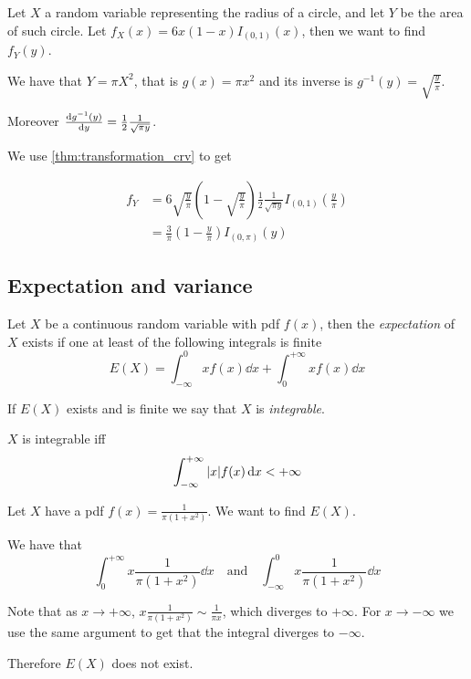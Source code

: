 \documentclass[14pt]{extarticle}
\begin{document}
\begin{example}
    Let $X$ a random variable representing the radius of a circle, and let $Y$ be the area of such circle.
    Let $f_X(x) = 6x(1-x)I_{(0,1)}(x)$, then we want to find $f_Y(y)$.

    We have that $Y = \pi X^2$, that is $g(x) = \pi x^2$ and its inverse is $g^{-1}(y) = \sqrt{\frac{y}{\pi}}$.

    Moreover $\dv{g^{-1}(y)}{y} = \frac{1}{2} \frac{1}{\sqrt{\pi y}}$.

    We use \autoref{thm:transformation_crv} to get

    \begin{align}
        f_Y & = 6\sqrt{\frac{y}{\pi}} \left(1- \sqrt{\frac{y}{\pi}}\right) \frac{1}{2} \frac{1}{\sqrt{\pi y}} I_{(0, 1)}\left(\frac{y}{\pi}\right) \\
            & = \frac{3}{\pi} \left(1- \frac{y}{\pi}\right) I_{(0, \pi)}(y)
    \end{align}

\end{example}

\subsection{Expectation and variance}

\begin{definition}[expectation]
    Let $X$ be a continuous random variable with pdf $f(x)$, then the \emph{expectation} of $X$ exists if one at least of the following integrals is finite
    \begin{equation}
        E(X) = \int_{-\infty}^{0} x f(x) \dd{x} + \int_{0}^{+\infty} x f(x) \dd{x}
    \end{equation}

    If $E(X)$ exists and is finite we say that $X$ is \emph{integrable}.
\end{definition}

\begin{lemma}
    $X$ is integrable iff
    \begin{equation}
        \int_{-\infty}^{+\infty} \abs{x} f(x) \dd{x} < +\infty
    \end{equation}
\end{lemma}

\begin{example}
    Let $X$ have a pdf $f(x) = \frac{1}{\pi (1+x^2)}$.
    We want to find $E(X)$.

    We have that
    \begin{equation}
        \int_0^{+\infty} x \frac{1}{\pi (1+x^2)} \dd{x} \quad \text{and} \quad \int_{-\infty}^0 x \frac{1}{\pi (1+x^2)} \dd{x}
    \end{equation}

    Note that as $x \to +\infty$, $x \frac{1}{\pi (1+x^2)} \sim \frac{1}{\pi x}$, which diverges to $+\infty$.
    For $x \to -\infty$ we use the same argument to get that the integral diverges to $-\infty$.

    Therefore $E(X)$ does not exist.
\end{example}
\end{document}
